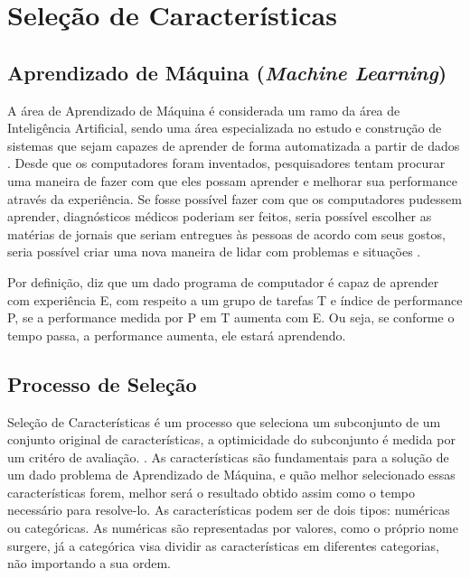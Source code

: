 \chapter[Seleção de Características]{Seleção de Características}

\section{Aprendizado de Máquina (\textit{Machine Learning})}

A área de Aprendizado de Máquina é considerada um ramo da área de Inteligência Artificial, sendo uma
área especializada no estudo e construção de sistemas que sejam capazes de aprender de
forma automatizada a partir de dados \cite{brink2014}. Desde que os computadores foram inventados, pesquisadores tentam procurar uma maneira de fazer com que eles possam aprender e melhorar sua performance através da experiência. Se fosse possível fazer com que os computadores pudessem aprender, diagnósticos médicos poderiam ser feitos, seria possível escolher as matérias de jornais que seriam entregues às pessoas de acordo com seus gostos, seria possível criar uma nova maneira de lidar com problemas e situações \cite{mitchell_1997}.

Por definição,  diz que um dado programa de computador é capaz de aprender com experiência E, com respeito a um grupo de tarefas T e índice de performance P, se a performance medida por P em T aumenta com E. Ou seja, se conforme o tempo passa, a performance aumenta, ele estará aprendendo.


\section{Processo de Seleção}

Seleção de Características é um processo que seleciona um subconjunto de um conjunto original de características, a optimicidade do subconjunto é medida por um critéro de avaliação. \cite{liu_2005}. As características são fundamentais para a solução de um dado problema de Aprendizado de Máquina, e quão melhor selecionado essas características forem, melhor será o resultado obtido assim como o tempo necessário para resolve-lo. As características podem ser de dois tipos: numéricas ou categóricas. As numéricas são representadas por valores, como o próprio nome surgere, já a categórica visa dividir as características em diferentes categorias, não importando a sua ordem. 

